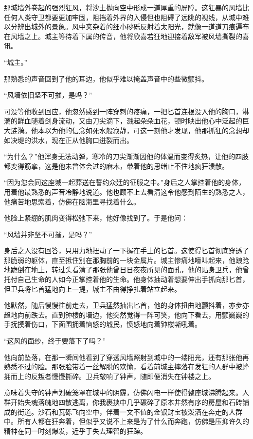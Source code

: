 那城墙外卷起的强烈狂风，将沙土抛向空中形成一道厚重的屏障。这狂暴的风墙比任何人类守卫都要更加牢固，阻挡着外界的入侵但也阻碍了远眺的视线，从城中难以分辨出城外的景象。风中夹杂着的细小砂砾反射着太阳光，就像一道道刀痕遍布在风墙之上。城主等待着下属的传音，他将欣喜若狂地迎接着敌军被风墙撕裂的喜讯。

“城主。”

那熟悉的声音回到了他的耳边，他似乎难以掩盖声音中的些微颤抖。

“风墙依旧坚不可摧，是吗？”

可没等他收到回应，他忽然感到一阵穿刺的疼痛，一把匕首连根没入他的胸口，淋漓的鲜血随着剑身流动，又由刀尖滴下，溅起朵朵血花，顿时映出他心中泛起的巨大涟漪。他本以为他的信念如死水般寂静，可这一刻他才发现，他那抓狂的念想却如决堤的洪水，现在正从他胸口迸裂而出。

“为什么？”他浑身无法动弹，寒冷的刀尖渐渐因他的体温而变得炙热，让他的四肢都变得筋挛，这是他未曾体会过的麻木，带着他的思绪止不住地疯狂溃散。

“因为您会同这座城一起葬送在誓约众廷的征服之中。”身后之人掌控着他的身体，用着他最熟悉的声音冷静地说道。他也顾不上去看清这令他感到陌生的熟悉之人，他痛苦地思索着，仿佛在脑海里寻找着什么。

他脸上紧绷的肌肉变得松弛下来，他好像找到了。于是他问：

“风墙并非坚不可摧，是吗？”

身后之人没有回答，只用力地扭动了一下握在手上的匕首。这使得匕首彻底穿透了那脆弱的躯体，直至抵住別在那胸前的一块金属片。城主惨痛地嚎叫起来，他踉跄地跪倒在地上，转过头看清了那张他曾日日夜夜所见的面孔，他的贴身卫兵，他曾托付自己生命的人如今正掌控着他的生命。他身体抽动着想要伸出手抓向那匕首，但卫兵将匕首猛地向上一提，城主不由得挣扎着站立起来。

他默然，随后慢慢往前走去，卫兵猛然抽出匕首，他的身体扭曲地颤抖着，亦步亦趋地向前跌去。直到钟楼的墙边，他突然觉得一阵可笑，他向下看去，用颤巍巍的手抚摸着伤口，下面围拥着恼怒的城民，愤怒地向着钟楼嘶吼着。

“这风的面纱，终于要落下了吗？”

他向前坠落，在那一瞬间他看到了穿透风墙照射到城中的一缕阳光，还有那张他再熟悉不过的脸。那张脸带着一丝解脱的欢愉，看着前城主摔落在发狂的人群中被蜂拥而上的反叛者慢慢撕碎。卫兵敲响了钟声，随即便消失在钟楼之上。

意味着失守的钟声划破笼罩在城中的阴霾，仿佛闪电一样使得整座城沸腾起来。人群开始失魂落魄地四散逃离，你我裹挟中几乎碾碎了原本井然有序的房屋和石砖铺成的街道。沙石和瓦砾飞向空中，伴着一文不值的金银财宝被泼洒在奔走的人群中。所有人都在狂奔着，但似乎又说不上来是为了什么而奔跑，仿佛是压抑许久的精神在同一时刻爆发，近乎于失去理智的狂躁。

